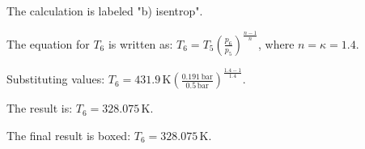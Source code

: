 The calculation is labeled "b) isentrop".  

The equation for \( T_6 \) is written as:  
\( T_6 = T_5 \left( \frac{p_6}{p_5} \right)^{\frac{n-1}{n}} \),  
where \( n = \kappa = 1.4 \).  

Substituting values:  
\( T_6 = 431.9 \, \text{K} \left( \frac{0.191 \, \text{bar}}{0.5 \, \text{bar}} \right)^{\frac{1.4-1}{1.4}} \).  

The result is:  
\( T_6 = 328.075 \, \text{K} \).  

The final result is boxed:  
\( T_6 = 328.075 \, \text{K} \).